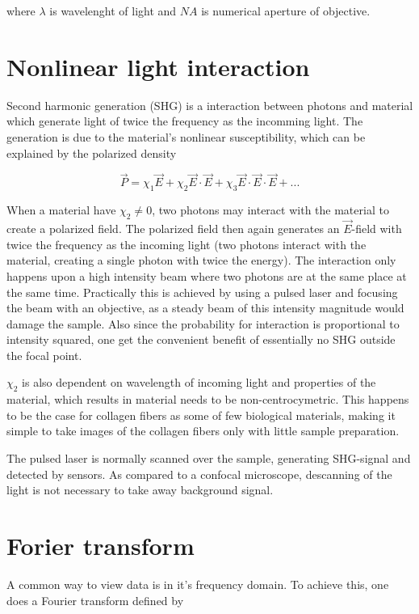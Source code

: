 where $\lambda$ is wavelenght of light and $NA$ is numerical aperture of objective.

%
%
\section{Nonlinear light interaction}
Second harmonic generation (SHG) is a interaction between photons and material which generate light of twice the frequency as the incomming light. The generation is due to the material's nonlinear susceptibility, which can be explained by the polarized density

\begin{equation}
\vec{P} = \chi_1 \vec{E} + \chi_2 \vec{E} \cdot \vec{E} + \chi_3\vec{E} \cdot \vec{E} \cdot \vec{E} + ...
\end{equation}

When a material have $\chi_2 \neq 0$, two photons may interact with the material to create a polarized field. The polarized field then again generates an $\vec{E}$-field with twice the frequency as the incoming light (two photons interact with the material, creating a single photon with twice the energy). The interaction only happens upon a high intensity beam where two photons are at the same place at the same time. Practically this is achieved by using a pulsed laser and focusing the beam with an objective, as a steady beam of this intensity magnitude would damage the sample. Also since the probability for interaction is proportional to intensity squared, one get the convenient benefit of essentially no SHG outside the focal point.

$\chi_2$ is also dependent on wavelength of incoming light and properties of the material, which results in material needs to be non-centrocymetric. This happens to be the case for collagen fibers as some of few biological materials, making it simple to take images of the collagen fibers only with little sample preparation.

The pulsed laser is normally scanned over the sample, generating SHG-signal and detected by sensors. As compared to a confocal microscope, descanning of the light is not necessary to take away background signal. 

%
%
\section{Forier transform}
A common way to view data is in it's frequency domain. To achieve this, one does a Fourier transform defined by

